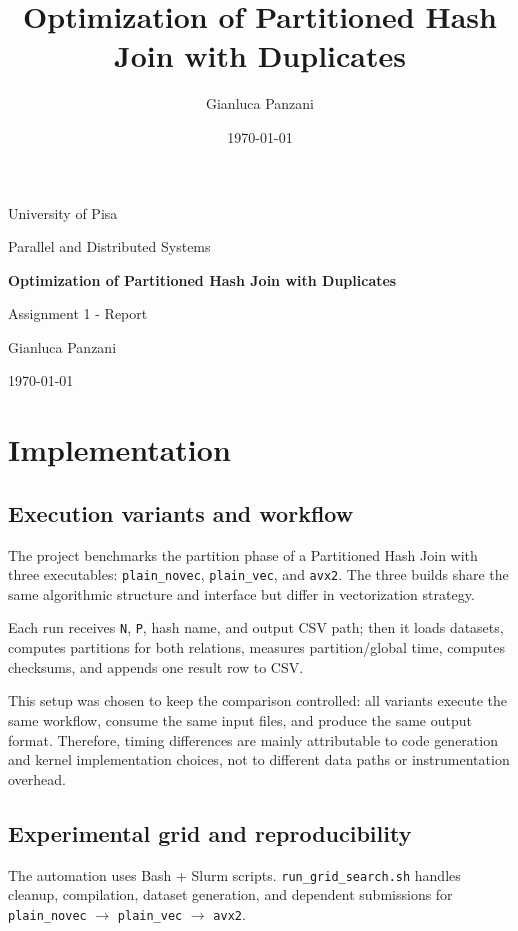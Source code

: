 \documentclass[11pt,a4paper]{article}
\title{Optimization of Partitioned Hash Join with Duplicates}
\author{Gianluca Panzani}
\date{\today}
\begin{document}
\begin{titlepage}
    \centering
    {\Large University of Pisa\par}
    \vspace{0.6cm}
    {\large Parallel and Distributed Systems\par}
    \vspace{2.0cm}
    {\LARGE \textbf{Optimization of Partitioned Hash Join with Duplicates}\par}
    \vspace{1.2cm}
    {\large Assignment 1 - Report\par}
    \vfill
    {\large Gianluca Panzani\par}
    \vspace{0.3cm}
    {\large \today\par}
\end{titlepage}

\tableofcontents
\newpage
{}

\section{Implementation}
\subsection{Execution variants and workflow}
The project benchmarks the partition phase of a Partitioned Hash Join with three executables: \texttt{plain\_novec}, \texttt{plain\_vec}, and \texttt{avx2}. The three builds share the same algorithmic structure and interface but differ in vectorization strategy.

Each run receives \texttt{N}, \texttt{P}, hash name, and output CSV path; then it loads datasets, computes partitions for both relations, measures partition/global time, computes checksums, and appends one result row to CSV.

This setup was chosen to keep the comparison controlled: all variants execute the same workflow, consume the same input files, and produce the same output format. Therefore, timing differences are mainly attributable to code generation and kernel implementation choices, not to different data paths or instrumentation overhead.

\subsection{Experimental grid and reproducibility}
The automation uses Bash + Slurm scripts. \texttt{run\_grid\_search.sh} handles cleanup, compilation, dataset generation, and dependent submissions for \texttt{plain\_novec} $\rightarrow$ \texttt{plain\_vec} $\rightarrow$ \texttt{avx2}.
\end{document}

